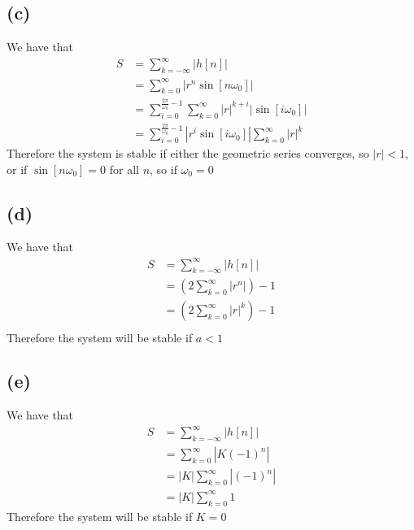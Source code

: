 \subsection*{(c)}
We have that
\begin{align*}
    S&=\sum_{k=-\infty}^{\infty}|h[n]|\\
    &=\sum_{k=0}^{\infty}\left|r^n\sin[n\omega_0]\right|\\
    &=\sum_{i=0}^{\frac{2\pi}{\omega_0}-1}\sum_{k=0}^{\infty}|r|^{k+i}\left|\sin[i\omega_0]\right|\\
    &=\sum_{i=0}^{\frac{2\pi}{\omega_0}-1}\left|r^{i}\sin[i\omega_0]\right|\sum_{k=0}^{\infty}|r|^{k}
\end{align*}
Therefore the system is stable if either the geometric series converges, so $\boxed{|r|<1}$, or 
if $\sin[n\omega_0]=0$ for all $n$, so if $\boxed{\omega_0=0}$
\subsection*{(d)}
We have that
\begin{align*}
    S&=\sum_{k=-\infty}^{\infty}|h[n]|\\
    &=\left(2\sum_{k=0}^{\infty}\left|r^n\right|\right)-1\\
    &=\left(2\sum_{k=0}^{\infty}|r|^{k}\right)-1\\
\end{align*}
Therefore the system will be stable if $\boxed{a<1}$
\subsection*{(e)}
We have that 
\begin{align*}
    S&=\sum_{k=-\infty}^{\infty}|h[n]|\\
    &=\sum_{k=0}^{\infty}\left|K(-1)^n\right|\\
    &=|K|\sum_{k=0}^{\infty}\left|(-1)^n\right|\\
    &=|K|\sum_{k=0}^{\infty}1
\end{align*}
Therefore the system will be stable if $\boxed{K=0}$

